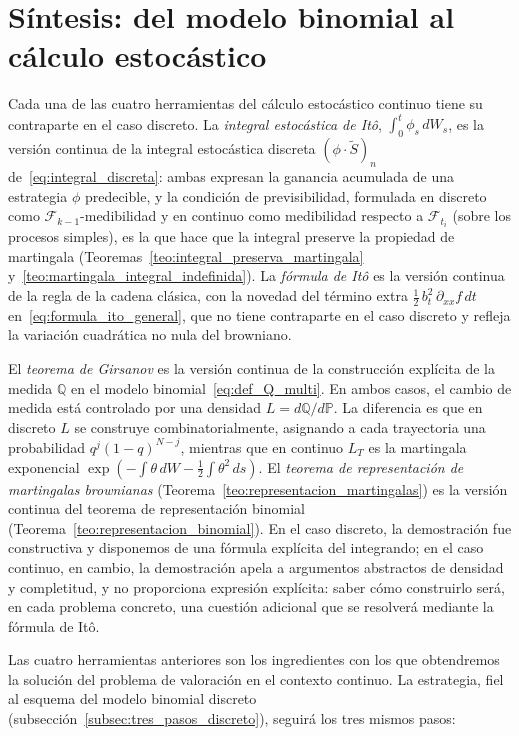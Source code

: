 \documentclass[11pt,a4paper,oneside]{report}
\theoremstyle{plain}
\theoremstyle{definition}
\theoremstyle{remark}
\newcommand{\PP}{\mathbb{P}}
\newcommand{\Q}{\mathbb{Q}}
\newcommand{\F}{\mathcal{F}}
\newcommand{\1}{\mathbf{1}}
\begin{document}
\section{Síntesis: del modelo binomial al cálculo estocástico}
\label{sec:sintesis_cap4}

Cada una
de las cuatro herramientas del cálculo estocástico continuo tiene su
contraparte en el caso discreto. La \emph{integral estocástica de
Itô}, $\int_0^t \phi_s\, dW_s$, es la versión continua de la integral
estocástica discreta $(\phi \cdot \widetilde S)_n$
de~\eqref{eq:integral_discreta}: ambas expresan la ganancia acumulada
de una estrategia $\phi$ predecible, y la condición de previsibilidad, formulada en discreto como $\F_{k-1}$-medibilidad y en continuo como
medibilidad respecto a $\F_{t_i}$ (sobre los procesos simples), es la
que hace que la integral preserve la propiedad de martingala
(Teoremas~\ref{teo:integral_preserva_martingala}
y~\ref{teo:martingala_integral_indefinida}). La \emph{fórmula de Itô}
es la versión continua de la regla de la cadena clásica, con la
novedad del término extra $\tfrac{1}{2}\, b_t^2\, \partial_{xx} f\,
dt$ en~\eqref{eq:formula_ito_general}, que no tiene contraparte en el
caso discreto y refleja la variación cuadrática no
nula del browniano.

El \emph{teorema de Girsanov} es la versión continua de la
construcción explícita de la medida $\Q$ en el modelo
binomial~\eqref{eq:def_Q_multi}. En ambos casos, el cambio de medida
está controlado por una densidad $L = d\Q/d\PP$. La diferencia es que
en discreto $L$ se construye combinatorialmente, asignando a cada
trayectoria una probabilidad $q^j(1-q)^{N-j}$, mientras que en
continuo $L_T$ es la martingala exponencial $\exp(-\int \theta\, dW -
\tfrac{1}{2}\int \theta^2\, ds)$. El \emph{teorema de representación
de martingalas brownianas} (Teorema~\ref{teo:representacion_martingalas})
es la versión continua del teorema de representación binomial
(Teorema~\ref{teo:representacion_binomial}). En el caso discreto, la
demostración fue constructiva y disponemos de una fórmula explícita
del integrando; en el caso continuo, en cambio, la demostración apela
a argumentos abstractos de densidad y completitud, y no proporciona
expresión explícita: saber cómo construirlo será, en cada problema
concreto, una cuestión adicional que se resolverá mediante la fórmula
de Itô.

Las
cuatro herramientas anteriores son los ingredientes con los que obtendremos
la solución del problema de valoración en el contexto continuo. La
estrategia, fiel al esquema del modelo binomial discreto
(subsección~\ref{subsec:tres_pasos_discreto}), seguirá los tres mismos
pasos:
\end{document}

